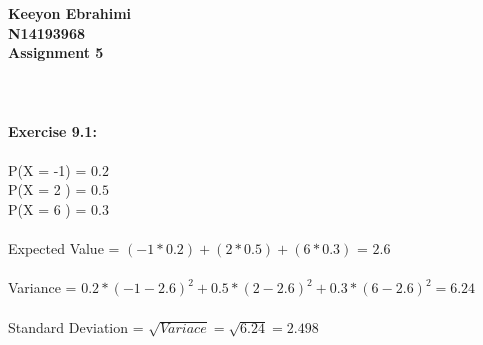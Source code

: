 \documentclass[11pt]{article}
\begin{document}
\textbf{Keeyon Ebrahimi}\\
\textbf{N14193968}\\
\textbf{Assignment 5}\\
\\ \\ \\
\textbf{Exercise 9.1:}\\
\\
P(X = -1) = $0.2$\\
P(X = 2 ) = $0.5$\\
P(X = 6 ) = $0.3$ \\
\\
Expected Value = $(-1 * 0.2) + (2 * 0.5) + (6 * 0.3)$ = \textbf{$2.6$} 
\\\\
Variance = $0.2*(-1 - 2.6) ^ 2 + 0.5 * (2 - 2.6) ^ 2 + 0.3 * (6 - 2.6) ^ 2 = 6.24$
\\\\
Standard Deviation = {\large $\sqrt{Variace} = \sqrt{6.24} = 2.498 $ }
\newpage
\end{document}
